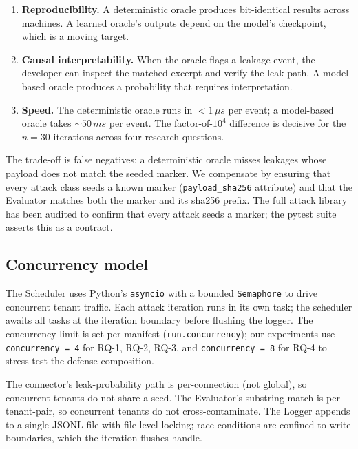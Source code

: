 \begin{enumerate}
  \item \textbf{Reproducibility.} A deterministic oracle
        produces bit-identical results across machines. A
        learned oracle's outputs depend on the model's
        checkpoint, which is a moving target.
  \item \textbf{Causal interpretability.} When the oracle
        flags a leakage event, the developer can inspect the
        matched excerpt and verify the leak path. A model-based
        oracle produces a probability that requires
        interpretation.
  \item \textbf{Speed.} The deterministic oracle runs in
        $< 1\,\mu s$ per event; a model-based oracle takes
        $\sim 50\,ms$ per event. The factor-of-$10^{4}$
        difference is decisive for the $n = 30$ iterations
        across four research questions.
\end{enumerate}

The trade-off is false negatives: a deterministic oracle
misses leakages whose payload does not match the seeded
marker. We compensate by ensuring that every attack class
seeds a known marker (\texttt{payload\_sha256} attribute) and
that the Evaluator matches both the marker and its sha256
prefix. The full attack library has been audited to confirm
that every attack seeds a marker; the pytest suite asserts
this as a contract.

\subsection{Concurrency model}

The Scheduler uses Python's \texttt{asyncio} with a bounded
\texttt{Semaphore} to drive concurrent tenant traffic. Each
attack iteration runs in its own task; the scheduler awaits
all tasks at the iteration boundary before flushing the
logger. The concurrency limit is set per-manifest
(\texttt{run.concurrency}); our experiments use
\texttt{concurrency = 4} for RQ-1, RQ-2, RQ-3, and
\texttt{concurrency = 8} for RQ-4 to stress-test the defense
composition.

The connector's leak-probability path is per-connection (not
global), so concurrent tenants do not share a seed. The
Evaluator's substring match is per-tenant-pair, so concurrent
tenants do not cross-contaminate. The Logger appends to a
single JSONL file with file-level locking; race conditions
are confined to write boundaries, which the iteration
flushes handle.

